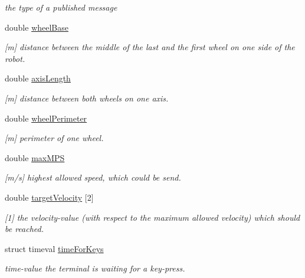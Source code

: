 \begin{DoxyCompactItemize}
\begin{DoxyCompactList}\small\item\em the type of a published message \end{DoxyCompactList}\item 
double \hyperlink{structSampleMoving_1_1sampleMovingSettingStruct_a9606973b8c9b90b8dc360855397505f9}{wheel\-Base}
\begin{DoxyCompactList}\small\item\em \mbox{[}m\mbox{]} distance between the middle of the last and the first wheel on one side of the robot. \end{DoxyCompactList}\item 
double \hyperlink{structSampleMoving_1_1sampleMovingSettingStruct_a72168d31106a7f5e12c2eb303a487515}{axis\-Length}
\begin{DoxyCompactList}\small\item\em \mbox{[}m\mbox{]} distance between both wheels on one axis. \end{DoxyCompactList}\item 
double \hyperlink{structSampleMoving_1_1sampleMovingSettingStruct_a3c927853f6d6514e45fb40e0f4c0b783}{wheel\-Perimeter}
\begin{DoxyCompactList}\small\item\em \mbox{[}m\mbox{]} perimeter of one wheel. \end{DoxyCompactList}\item 
double \hyperlink{structSampleMoving_1_1sampleMovingSettingStruct_a293fb79eebdf2c0f45aa196070391c82}{max\-M\-P\-S}
\begin{DoxyCompactList}\small\item\em \mbox{[}m/s\mbox{]} highest allowed speed, which could be send. \end{DoxyCompactList}\item 
double \hyperlink{structSampleMoving_1_1sampleMovingSettingStruct_a1fd52fce6a806d0ee764867ab142b255}{target\-Velocity} \mbox{[}2\mbox{]}
\begin{DoxyCompactList}\small\item\em \mbox{[}1\mbox{]} the velocity-\/value (with respect to the maximum allowed velocity) which should be reached. \end{DoxyCompactList}\item 
struct timeval \hyperlink{structSampleMoving_1_1sampleMovingSettingStruct_a4d960897101facc5a4d0e0998d68728e}{time\-For\-Keys}
\begin{DoxyCompactList}\small\item\em time-\/value the terminal is waiting for a key-\/press. \end{DoxyCompactList}\item 

\end{DoxyCompactItemize}

